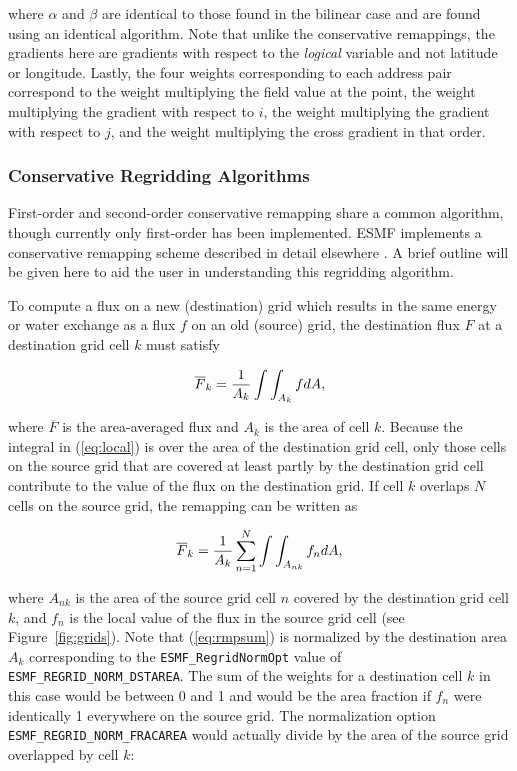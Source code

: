      where $\alpha$ and $\beta$ are identical to those found in the bilinear
     case and are found using an identical algorithm.  Note that unlike the
     conservative remappings, the gradients here are gradients with respect to
     the {\em logical} variable and not latitude or longitude.  Lastly, the four
     weights corresponding to each address pair correspond to the weight
     multiplying the field value at the point, the weight multiplying the
     gradient with respect to $i$, the weight multiplying the gradient with
     respect to $j$, and the weight multiplying the cross gradient in that order.


\subsubsection{Conservative Regridding Algorithms}
\label{sec:ConserveRegrid}

     First-order and second-order conservative remapping share a common
     algorithm, though currently only first-order has been implemented.
     ESMF implements a conservative remapping scheme described in detail
     elsewhere \cite{Jones1999}.  A brief outline will be given
     here to aid the user in understanding this regridding algorithm.

     To compute a flux on a new (destination) grid which results in the same
     energy or water exchange as a flux $f$ on an old (source) grid, the
     destination flux $F$ at a destination grid cell $k$ must satisfy

\begin{equation}\label{eq:local}
\overline{F}_k = {1\over{A_k}}\int\int_{A_k} fdA,
\end{equation}

     where $\overline{F}$ is the area-averaged flux and $A_k$ is the area of
     cell $k$. Because the integral in (\ref{eq:local}) is over the area of 
     the destination grid cell, only those cells on the source grid that are
     covered at least partly by the destination grid cell contribute to the
     value of the flux on the destination grid.  If cell $k$ overlaps $N$ cells
     on the source grid, the remapping can be written as 

\begin{equation}\label{eq:rmpsum}
\overline{F}_k = 
{1\over{A_k}} \sum_{n=1}^N \int\int_{A_{nk}} f_ndA,
\end{equation}

     where $A_{nk}$ is the area of the source grid cell $n$ covered by the
     destination grid cell $k$, and $f_n$ is the local value of the flux in the
     source grid cell (see Figure~\ref{fig:grids}).  Note that (\ref{eq:rmpsum})
     is normalized by the destination area $A_k$ corresponding to the
     {\tt ESMF\_RegridNormOpt} value of {\tt ESMF\_REGRID\_NORM\_DSTAREA}.  The
     sum of the weights for a destination cell $k$ in this case would be between
     0 and 1 and would be the area fraction if $f_n$ were identically 1 
     everywhere on the source grid.  The normalization option
     {\tt ESMF\_REGRID\_NORM\_FRACAREA} would actually divide by the area of the
     source grid overlapped by cell $k$: 

